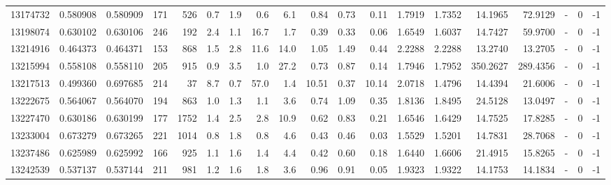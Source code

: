 \begin{tabular}{rrrrrrrrrrrrrrrrlrr}
  13174732 & 0.580908 &   0.580909 &  171 &  526 &      0.7 &      1.9 &     0.6 &      6.1 &       0.84 &        0.73 &        0.11 &  1.7919 &  1.7352 &   14.1965 &   72.9129 &             - &        0 &         -1 \\
  13198074 & 0.630102 &   0.630106 &  246 &  192 &      2.4 &      1.1 &    16.7 &      1.7 &       0.39 &        0.33 &        0.06 &  1.6549 &  1.6037 &   14.7427 &   59.9700 &             - &        0 &         -1 \\
  13214916 & 0.464373 &   0.464371 &  153 &  868 &      1.5 &      2.8 &    11.6 &     14.0 &       1.05 &        1.49 &        0.44 &  2.2288 &  2.2288 &   13.2740 &   13.2705 &             - &        0 &         -1 \\
  13215994 & 0.558108 &   0.558110 &  205 &  915 &      0.9 &      3.5 &     1.0 &     27.2 &       0.73 &        0.87 &        0.14 &  1.7946 &  1.7952 &  350.2627 &  289.4356 &             - &        0 &         -1 \\
  13217513 & 0.499360 &   0.697685 &  214 &   37 &      8.7 &      0.7 &    57.0 &      1.4 &      10.51 &        0.37 &       10.14 &  2.0718 &  1.4796 &   14.4394 &   21.6006 &             - &        0 &         -1 \\
  13222675 & 0.564067 &   0.564070 &  194 &  863 &      1.0 &      1.3 &     1.1 &      3.6 &       0.74 &        1.09 &        0.35 &  1.8136 &  1.8495 &   24.5128 &   13.0497 &             - &        0 &         -1 \\
  13227470 & 0.630186 &   0.630199 &  177 & 1752 &      1.4 &      2.5 &     2.8 &     10.9 &       0.62 &        0.83 &        0.21 &  1.6546 &  1.6429 &   14.7525 &   17.8285 &             - &        0 &         -1 \\
  13233004 & 0.673279 &   0.673265 &  221 & 1014 &      0.8 &      1.8 &     0.8 &      4.6 &       0.43 &        0.46 &        0.03 &  1.5529 &  1.5201 &   14.7831 &   28.7068 &             - &        0 &         -1 \\
  13237486 & 0.625989 &   0.625992 &  166 &  925 &      1.1 &      1.6 &     1.4 &      4.4 &       0.42 &        0.60 &        0.18 &  1.6440 &  1.6606 &   21.4915 &   15.8265 &             - &        0 &         -1 \\
  13242539 & 0.537137 &   0.537144 &  211 &  981 &      1.2 &      1.6 &     1.8 &      3.6 &       0.96 &        0.91 &        0.05 &  1.9323 &  1.9322 &   14.1753 &   14.1834 &             - &        0 &         -1 \\

\end{tabular}
